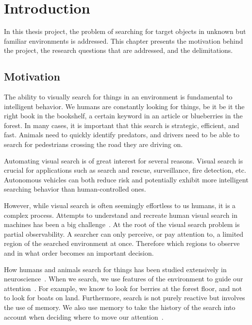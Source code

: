 \chapter{Introduction}
\label{cha:introduction}

In this thesis project, the problem of searching for target objects in unknown but familiar environments is addressed.
This chapter presents the motivation behind the project, the research questions that are addressed, and the delimitations. 

\section{Motivation}
\label{sec:motivation}

The ability to visually search for things in an environment is fundamental to intelligent behavior.
We humans are constantly looking for things, be it be it the right book in the bookshelf, a certain keyword in an article or blueberries in the forest.
In many cases, it is important that this search is strategic, efficient, and fast.
Animals need to quickly identify predators, and drivers need to be able to search for pedestrians crossing the road they are driving on.

Automating visual search is of great interest for several reasons.
Visual search is crucial for applications such as search and rescue, surveillance, fire detection, etc.
Autonomous vehicles can both reduce risk and potentially exhibit more intelligent searching behavior than human-controlled ones.

However, while visual search is often seemingly effortless to us humans, it is a complex process.
Attempts to understand and recreate human visual search in machines has been a big challenge~\cite{eckstein_visual_2011}.
At the root of the visual search problem is partial observability.
A searcher can only perceive, or pay attention to, a limited region of the searched environment at once.
Therefore which regions to observe and in what order becomes an important decision. 

How humans and animals search for things has been studied extensively in neuroscience~\cite{eckstein_visual_2011,wolfe_visual_2010,nakayama_situating_2011}.
When we search, we use features of the environment to guide our attention~\cite{wolfe_five_2017,eckstein_visual_2011}.
For example, we know to look for berries at the forest floor, and not to look for boats on land.
Furthermore, search is not purely reactive but involves the use of memory.
We also use memory to take the history of the search into account when deciding where to move our attention~\cite{wolfe_five_2017}.

